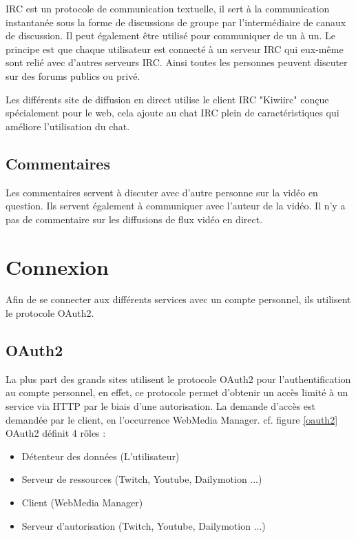 \documentclass[11pt]{report} %
\begin{document}
		IRC est un protocole de communication textuelle, il sert à la communication instantanée sous la forme de discussions de groupe par l'intermédiaire de canaux de discussion. Il peut également être utilisé pour communiquer de un à un.
		Le principe est que chaque utilisateur est connecté à un serveur IRC qui eux-même sont relié avec d'autres serveurs IRC. Ainsi toutes les personnes peuvent discuter sur des forums publics ou privé.
		
		Les différents site de diffusion en direct utilise le client IRC "Kiwiirc" conçue spécialement pour le web, cela ajoute au chat IRC plein de caractéristiques qui améliore l'utilisation du chat.
		
		\subsection{Commentaires}
		Les commentaires servent à discuter avec d'autre personne sur la vidéo en question. Ils servent également à communiquer avec l'auteur de la vidéo.
		Il n'y a pas de commentaire sur les diffusions de flux vidéo en direct.
		
	\newpage
	\section{Connexion}
	Afin de se connecter aux différents services avec un compte personnel, ils utilisent le protocole OAuth2.
		\subsection{OAuth2}
		\label{sectionOauth2}
		La plus part des grands sites utilisent le protocole OAuth2 pour l'authentification au compte personnel, en effet, ce protocole permet d'obtenir un accès limité à un service via HTTP par le biais d'une autorisation. 
		La demande d'accès est demandée par le client, en l'occurrence WebMedia Manager.
		cf. figure \ref{oauth2}\\
		OAuth2 définit 4 rôles :
		\begin{itemize}
			\item Détenteur des données (L'utilisateur)
			\item Serveur de ressources (Twitch, Youtube, Dailymotion ...)
			\item Client (WebMedia Manager)
			\item Serveur d'autorisation (Twitch, Youtube, Dailymotion ...)
		\end{itemize}
		
\end{document}
